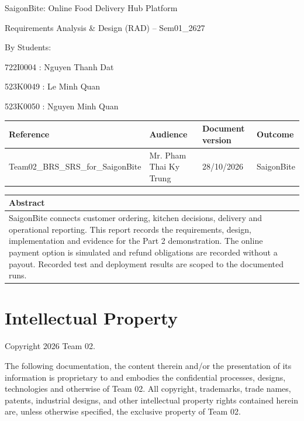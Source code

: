 

\begin{titlepage}
\centering
{\LARGE SaigonBite: Online Food Delivery Hub Platform\par}
\vspace{8mm}
{\large Requirements Analysis \& Design (RAD) -- Sem01\_2627\par}
\vspace{10mm}
By Students:\par
722I0004 : Nguyen Thanh Dat\par
523K0049 : Le Minh Quan\par
523K0050 : Nguyen Minh Quan\par
\vfill
\begin{tabularx}{\linewidth}{|X|X|X|X|}\hline
Reference & Audience & Document version & Outcome \\ \hline
Team02\_BRS\_SRS\_for\_SaigonBite & Mr. Pham Thai Ky Trung & 28/10/2026 & SaigonBite \\ \hline
\end{tabularx}
\vspace{8mm}
\begin{tabularx}{\linewidth}{|X|}\hline
\textbf{Abstract} \\ \hline
SaigonBite connects customer ordering, kitchen decisions, delivery and operational reporting. This report records the requirements, design, implementation and evidence for the Part 2 demonstration. The online payment option is simulated and refund obligations are recorded without a payout. Recorded test and deployment results are scoped to the documented runs. \\ \hline
\end{tabularx}
\end{titlepage}
\section*{Intellectual Property}
Copyright 2026 Team 02.

The following documentation, the content therein and/or the presentation of its information is proprietary to and embodies the confidential processes, designs, technologies and otherwise of Team 02. All copyright, trademarks, trade names, patents, industrial designs, and other intellectual property rights contained herein are, unless otherwise specified, the exclusive property of Team 02.

